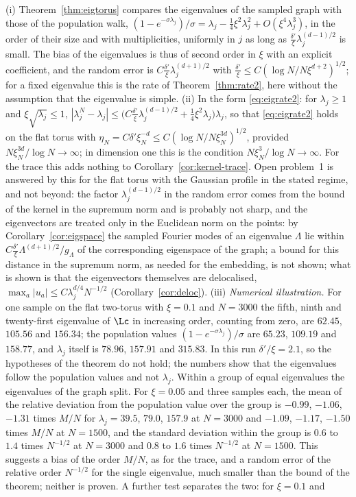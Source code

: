 \begin{remark}\label{rem:eigtorus}
(i) Theorem~\ref{thm:eigtorus} compares the eigenvalues of the sampled graph with those of the population walk, $(1-e^{-\sigma\lambda_j})/\sigma=\lambda_j-\frac14\xi^2\lambda_j^2+O(\xi^4\lambda_j^3)$, in the order of their size and with multiplicities, uniformly in $j$ as long as $\frac{\delta'}\xi\lambda_j^{(d-1)/2}$ is small. The bias of the eigenvalues is thus of second order in $\xi$ with an explicit coefficient, and the random error is $C\frac{\delta'}\xi\lambda_j^{(d+1)/2}$ with $\frac{\delta'}\xi\le C(\log N/N\xi^{d+2})^{1/2}$; for a fixed eigenvalue this is the rate of Theorem~\ref{thm:rate2}, here without the assumption that the eigenvalue is simple. (ii) In the form \eqref{eq:eigrate2}: for $\lambda_j\ge1$ and $\xi\sqrt{\lambda_j}\le1$, $|\lambda^N_j-\lambda_j|\le\big(C\frac{\delta'}\xi\lambda_j^{(d-1)/2}+\frac14\xi^2\lambda_j\big)\lambda_j$, so that \eqref{eq:eigrate2} holds on the flat torus with $\eta_N=C\delta'\xi_N^{-d}\le C(\log N/N\xi_N^{3d})^{1/2}$, provided $N\xi_N^{3d}/\log N\to\infty$; in dimension one this is the condition $N\xi_N^3/\log N\to\infty$. For the trace this adds nothing to Corollary~\ref{cor:kernel-trace}. Open problem~1 is answered by this for the flat torus with the Gaussian profile in the stated regime, and not beyond: the factor $\lambda_j^{(d-1)/2}$ in the random error comes from the bound of the kernel in the supremum norm and is probably not sharp, and the eigenvectors are treated only in the Euclidean norm on the points: by Corollary~\ref{cor:eigspace} the sampled Fourier modes of an eigenvalue $\Lambda$ lie within $C\frac{\delta'}\xi\Lambda^{(d+1)/2}/g_\Lambda$ of the corresponding eigenspace of the graph; a bound for this distance in the supremum norm, as needed for the embedding, is not shown; what is shown is that the eigenvectors themselves are delocalised, $\max_a|u_a|\le C\lambda_j^{d/4}N^{-1/2}$ (Corollary~\ref{cor:deloc}). (iii) \emph{Numerical illustration.} For one sample on the flat two-torus with $\xi=0.1$ and $N=3000$ the fifth, ninth and twenty-first eigenvalue of $\Lc$ in increasing order, counting from zero, are $62.45$, $105.56$ and $156.34$; the population values $(1-e^{-\sigma\lambda_j})/\sigma$ are $65.23$, $109.19$ and $158.77$, and $\lambda_j$ itself is $78.96$, $157.91$ and $315.83$. In this run $\delta'/\xi=2.1$, so the hypotheses of the theorem do not hold; the numbers show that the eigenvalues follow the population values and not $\lambda_j$. Within a group of equal eigenvalues the eigenvalues of the graph split. For $\xi=0.05$ and three samples each, the mean of the relative deviation from the population value over the group is $-0.99$, $-1.06$, $-1.31$ times $M/N$ for $\lambda_j=39.5$, $79.0$, $157.9$ at $N=3000$ and $-1.09$, $-1.17$, $-1.50$ times $M/N$ at $N=1500$, and the standard deviation within the group is $0.6$ to $1.4$ times $N^{-1/2}$ at $N=3000$ and $0.8$ to $1.6$ times $N^{-1/2}$ at $N=1500$. This suggests a bias of the order $M/N$, as for the trace, and a random error of the relative order $N^{-1/2}$ for the single eigenvalue, much smaller than the bound of the theorem; neither is proven. A further test separates the two: for $\xi=0.1$ and 
\end{remark}
